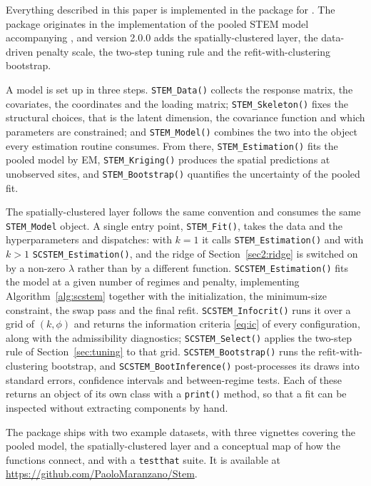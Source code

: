 Everything described in this paper is implemented in the \Stem{} package for \Rlang{}. The package originates in the implementation of the pooled STEM model accompanying \citet{FassoCameletti2010}, and version 2.0.0 adds the spatially-clustered layer, the data-driven penalty scale, the two-step tuning rule and the refit-with-clustering bootstrap.

A model is set up in three steps. \texttt{STEM\_Data()} collects the response matrix, the covariates, the coordinates and the loading matrix; \texttt{STEM\_Skeleton()} fixes the structural choices, that is the latent dimension, the covariance function and which parameters are constrained; and \texttt{STEM\_Model()} combines the two into the object every estimation routine consumes. From there, \texttt{STEM\_Estimation()} fits the pooled model by EM, \texttt{STEM\_Kriging()} produces the spatial predictions at unobserved sites, and \texttt{STEM\_Bootstrap()} quantifies the uncertainty of the pooled fit.

The spatially-clustered layer follows the same convention and consumes the same \texttt{STEM\_Model} object. A single entry point, \texttt{STEM\_Fit()}, takes the data and the hyperparameters and dispatches: with $k = 1$ it calls \texttt{STEM\_Estimation()} and with $k > 1$ \texttt{SCSTEM\_Estimation()}, and the ridge of Section~\ref{sec2:ridge} is switched on by a non-zero $\lambda$ rather than by a different function. \texttt{SCSTEM\_Estimation()} fits the model at a given number of regimes and penalty, implementing Algorithm~\ref{alg:scstem} together with the initialization, the minimum-size constraint, the swap pass and the final refit. \texttt{SCSTEM\_Infocrit()} runs it over a grid of $(k, \phi)$ and returns the information criteria \eqref{eq:ic} of every configuration, along with the admissibility diagnostics; \texttt{SCSTEM\_Select()} applies the two-step rule of Section~\ref{sec:tuning} to that grid. \texttt{SCSTEM\_Bootstrap()} runs the refit-with-clustering bootstrap, and \texttt{SCSTEM\_BootInference()} post-processes its draws into standard errors, confidence intervals and between-regime tests. Each of these returns an object of its own class with a \texttt{print()} method, so that a fit can be inspected without extracting components by hand.

The package ships with two example datasets, with three vignettes covering the pooled model, the spatially-clustered layer and a conceptual map of how the functions connect, and with a \texttt{testthat} suite. It is available at \url{https://github.com/PaoloMaranzano/Stem}.





